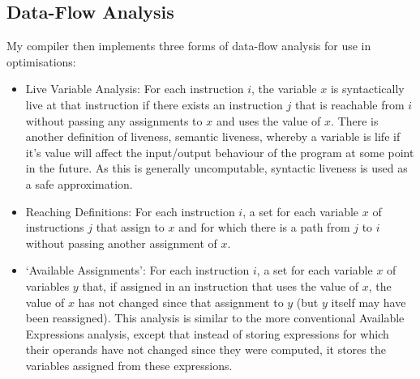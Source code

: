 \documentclass[12pt,twoside,notitlepage]{report}
\newcommand{\cfbox}[2]{%
	\colorlet{currentcolor}{.}%
	{\color{#1}%
		\fbox{\color{currentcolor}#2}}%
}
\newcommand\note[1]{\noindent\cfbox{blue}{\parbox{\textwidth}{\textcolor{blue}{#1}}}}
\begin{document}
\subsection{Data-Flow Analysis}
My compiler then implements three forms of data-flow analysis for use in optimisations:
\begin{itemize}
	\item Live Variable Analysis: For each instruction $i$, the variable $x$ is syntactically live at that instruction if there exists an instruction $j$ that is reachable from $i$ without passing any assignments to $x$ and uses the value of $x$. There is another definition of liveness, semantic liveness, whereby a variable is life if it's value will affect the input/output behaviour of the program at some point in the future. As this is generally uncomputable, syntactic liveness is used as a safe approximation.
	\item Reaching Definitions: For each instruction $i$, a set for each variable $x$ of instructions $j$ that assign to $x$ and for which there is a path from $j$ to $i$ without passing another assignment of $x$.
	\item `Available Assignments': For each instruction $i$, a set for each variable $x$ of variables $y$ that, if assigned in an instruction that uses the value of $x$, the value of $x$ has not changed since that assignment to $y$ (but $y$ itself may have been reassigned). This analysis is similar to the more conventional Available Expressions analysis, except that instead of storing expressions for which their operands have not changed since they were computed, it stores the variables assigned from these expressions.
	\note{Someone must have done this before? YES IT IS CALLED ALIAS ANALYSIS EXCEPT WE DO IT WITH NUMBERS NOT POINTERS Also while yes it is similar to Available Expressions, it does use weird positive/negative sets and big-union instead of a single-set and big-intersection. The wikipedia page for alias analysis definitely says there are three possibilities (definitely equal is in positive, unsure is in neither, and `definitely different' is in negative). \begin{itemize}
			\item Add y to x's sets: add to positive, remove from negative
			\item x is assigned, so all variables that might use it are now invalid: move everything from positive set into negative set
			\item Union: union the negative sets, new positive set is union of positive sets minus union of negative sets

\end{itemize}}
\end{itemize}
\end{document}
